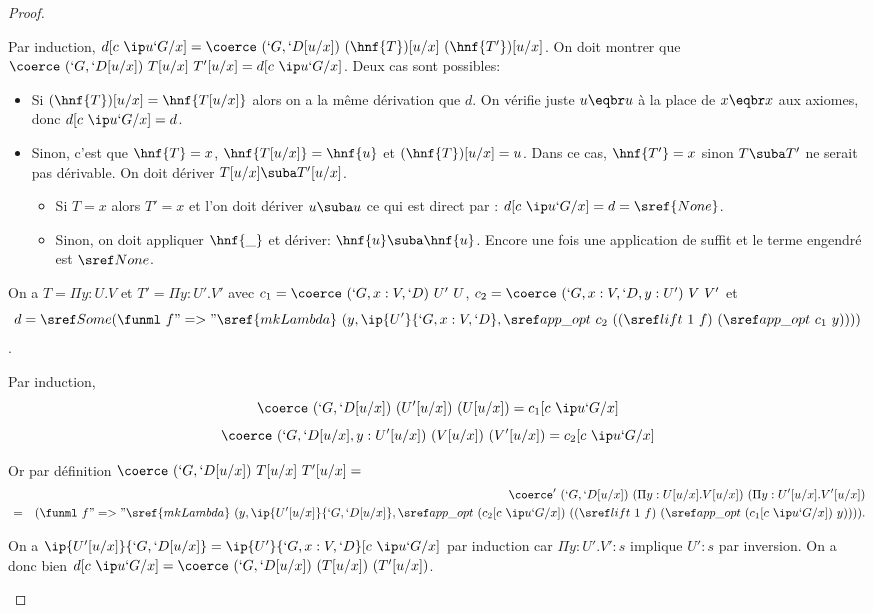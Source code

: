 \begin{proof}
\begin{induction}
    Par induction, $d\cux = \coerce~(\Gr)~(\hnf{T})[u/x]~(\hnf{T'})[u/x]$.
    On doit montrer que $\coerce~(\Gr)~T[u/x]~T'[u/x] = d\cux$.    
    Deux cas sont possibles:
    \begin{itemize}
    \item Si $(\hnf{T})[u/x] =
      \hnf{T[u/x]}$ alors on a la même dérivation que $d$. On vérifie
      juste $u \eqbr u$ à la place de $x \eqbr x$ aux axiomes, donc $d\cux
      = d$.
    \item Sinon,
      c'est que $\hnf{T} = x$, $\hnf{T[u/x]} = \hnf{u}$ et $(\hnf{T})[u/x]
      = u$. Dans ce cas, $\hnf{T'} = x$ sinon $T \suba T'$ ne serait pas
      dérivable. On doit dériver $T[u/x] \suba T'[u/x]$. 
      
      \begin{itemize}
      \item Si $T = x$ alors
        $T' = x$ et l'on doit dériver $u \suba u$ ce qui est direct par
        : $d\cux = d = \sref{None}$.
        
      \item Sinon, on doit appliquer $\hnf{\_}$ et dériver:
        $\hnf{u} \suba \hnf{u}$. Encore une fois une application de
         suffit et le terme engendré est $\None$.
      \end{itemize}
    \end{itemize}
    
    On a $T = \Pi y : U.V$ et $T' = \Pi y : U'.V'$ avec
    $c_1 = \coerce~(\GD)~U'~U$, $c_2 = \coerce~(\GD, y : U')~V~V'$ et
    \[d = \Some (\funml~f "=>"
    \sref{mkLambda}~(y, \ip{U'}{\GD},
    \appopt~c_2~((\lift~1~f)~(\appopt~c_1~y))))\].
    
    Par induction, 
    \[\coerce~(\Gr)~(U'[u/x])~(U[u/x]) = c_1\cux\]
    \[\coerce~(\Gr, y : U'[u/x])~(V[u/x])~(V'[u/x]) = c_2\cux\]

    Or par définition $\coerce~(\Gr)~T[u/x]~T'[u/x] =$
    \begin{eqnarray*}
       & &
      \coerce'~(\Gr)~(\Pi y : U[u/x].V[u/x])~(\Pi y : U'[u/x].V'[u/x])
      \\
      & = & (\funml~f "=>"
      \sref{mkLambda}~(y, \ip{U'[u/x]}{\Gr},
      \appopt~(c_2\cux)~((\lift~1~f)~(\appopt~(c_1\cux)~y)))).
    \end{eqnarray*}
    
    On a $\ip{U'[u/x]}{\Gr} = \ip{U'}{\GD}\cux$ par induction car $\Pi y :
    U'.V' : s$ implique $U' : s$ par inversion. On a donc bien $d\cux =
    \coerce~(\Gr)~(T[u/x])~(T'[u/x])$.
  \end{induction}
  

\end{proof}

